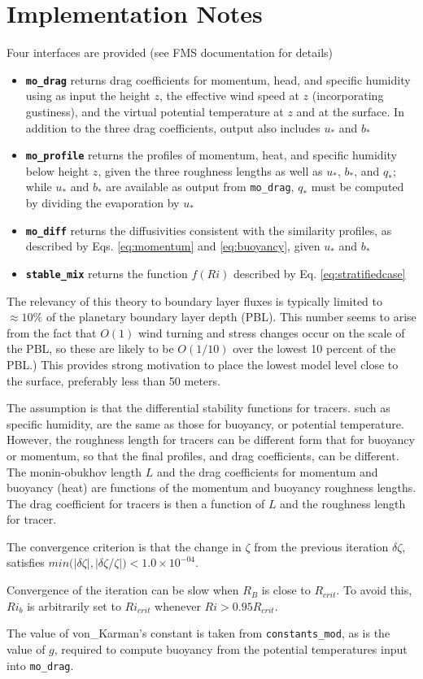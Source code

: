 \documentclass[12pt, letterpaper]{article}
\begin{document}
\section{Implementation Notes}

Four interfaces are provided (see FMS documentation for details)
\begin{itemize}
  \item \textbf{\texttt{mo\_drag}} returns drag coefficients for
    momentum, head, and specific humidity using as input the height
    $z$, the effective wind speed at $z$ (incorporating gustiness),
    and the virtual potential temperature at $z$ and at the surface.
    In addition to the three drag coefficients, output also includes
    $u_*$ and $b_*$
  \item \textbf{\texttt{mo\_profile}} returns the profiles of momentum,
    heat, and specific humidity below height $z$, given the three
    roughness lengths as well as $u_*$, $b_*$, and $q_*$; while $u_*$
    and $b_*$ are available as output from \texttt{mo\_drag}, $q_*$
    must be computed by dividing the evaporation by $u_*$
  \item \textbf{\texttt{mo\_diff}} returns the diffusivities
    consistent with the similarity profiles, as described by
    Eqs. \eqref{eq:momentum} and \eqref{eq:buoyancy}, given $u_*$ and $b_*$
  \item \textbf{\texttt{stable\_mix}} returns the function $f(Ri)$
    described by Eq. \eqref{eq:stratifiedcase}
\end{itemize}

The relevancy of this theory to boundary layer fluxes is typically
limited to $\approx 10\%$ of the planetary boundary layer depth (PBL).
This number seems to arise from the fact that $O(1)$ wind turning and
stress changes occur on the scale of the PBL, so these are likely to
be $O(1/10)$ over the lowest 10 percent of the PBL.)  This provides
strong motivation to place the lowest model level close to the
surface, preferably less than 50 meters.

The assumption is that the differential stability functions for
tracers. such as specific humidity, are the same as those for
buoyancy, or potential temperature.  However, the roughness length for
tracers can be different form that for buoyancy or momentum, so that
the final profiles, and drag coefficients, can be different.  The
monin-obukhov length $L$ and the drag coefficients for momentum and
buoyancy (heat) are functions of the momentum and buoyancy roughness
lengths.  The drag coefficient for tracers is then a function of $L$
and the roughness length for tracer.

The convergence criterion is that the change in $\zeta$ from the
previous iteration $\delta\zeta$, satisfies
$min\big(|\delta\zeta|,|\delta\zeta/\zeta|\big)<1.0\times10^{-04}$.

Convergence of the iteration can be slow when $R_B$ is close to
$R_{crit}$.  To avoid this, $Ri_b$ is arbitrarily set to $Ri_{crit}$
whenever $Ri>0.95R_{crit}$.

The value of von\_Karman's constant is taken from
\texttt{constants\_mod}, as is the value of $g$, required to compute
buoyancy from the potential temperatures input into \texttt{mo\_drag}.
\end{document}
